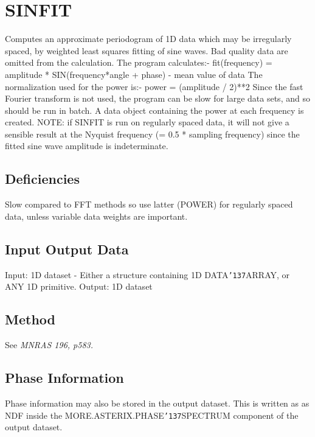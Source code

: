 \documentclass{book}
\renewcommand{\_}{{\tt\char'137}}     %
\begin{document}
\section{SINFIT}
Computes an approximate periodogram of 1D data which may be
irregularly spaced, by weighted least squares fitting of sine
waves. Bad quality data are omitted from the calculation. The
program calculates:-
fit(frequency) = amplitude * SIN(frequency*angle + phase)
- mean value of data
The normalization used for the power is:-
power = (amplitude / 2)**2
Since the fast Fourier transform is not used, the program can be
slow for large data sets, and so should be run in batch.
A data object containing the power at each frequency is created.
NOTE: if SINFIT is run on regularly spaced data, it
will not give a sensible result at the Nyquist
frequency (= 0.5 * sampling frequency) since the
fitted sine wave amplitude is indeterminate.
\subsection{Deficiencies}
Slow compared to FFT methods so use latter (POWER) for regularly
spaced data, unless variable data weights are important.
 
\subsection{Input Output Data}
Input: 1D dataset - Either a structure containing 1D DATA\_ARRAY,
or ANY 1D primitive.
Output: 1D dataset
\subsection{Method}
See {\em MNRAS 196, p583.}
\subsection{Phase Information}
Phase information may also be stored in the output dataset. This
is written as as NDF inside the MORE.ASTERIX.PHASE\_SPECTRUM
component of the output dataset.
 
\end{document}
